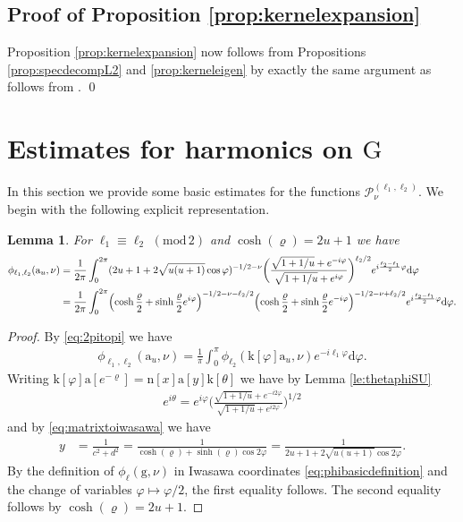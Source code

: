 \documentclass[12pt]{amsart}
\newtheorem{lemma}[theorem]{Lemma}
\theoremstyle{definition}
\theoremstyle{remark}
\numberwithin{equation}{section}
\newcommand{\G}{\mathrm{G}}
\newcommand{\PP}{\mathcal{P}}
\newcommand{\1}{{\mathbf 1}}
\renewcommand{\a}{\mathrm{a}}
\newcommand{\n}{\mathrm{n}}
\renewcommand{\k}{\mathrm{k}}
\newcommand{\g}{\mathrm{g}}
\renewcommand{\d}{\mathrm d}
\renewcommand{\n}{\mathrm{n}}
\renewcommand{\pmod}[1]{\,\,(\mathrm{mod}\,{#1})}
\begin{document}
\subsection{Proof of Proposition \ref{prop:kernelexpansion}}
Proposition \ref{prop:kernelexpansion} now follows from Propositions \ref{prop:specdecompL2}  and \ref{prop:kerneleigen}  by exactly the same argument as \cite[Proposition 5.1]{GM} follows from \cite[Proposition 5.2]{GM}.
\qed

\section{Estimates for harmonics on $\G$}
In this section we provide some basic estimates for the functions $\PP_\nu^{(\ell_1,\ell_2)}$. We begin with the following explicit representation.
\begin{lemma}\label{lem:phirewritten}
For $\ell_1 \equiv \ell_2 \pmod{2}$ and $ \cosh(\varrho) = 2u+1$  we have
    \begin{align*}
       \phi_{\ell_1,\ell_2}(\a_u,\nu) &= \frac{1}{ 2\pi } \int_0^{2\pi } (2u+1 + 2\sqrt{u(u+1)} \cos \varphi)^{-1/2-\nu}  
 \bigg(\frac{\sqrt{1+1/u} + e^{-i\varphi}}{\sqrt{1+1/u} + e^{i\varphi}}\bigg)^{\ell_2/2} e^{i\frac{\ell_2-\ell_1}{2} \varphi } \d \varphi\\
 &= \frac{1}{2 \pi } \int_0^{2\pi} \Bigl(\cosh \frac{\varrho}{2}+\sinh \frac{\varrho}{2} e^{i \varphi}\Bigr)^{-1/2-\nu-\ell_2/2}\Bigl(\cosh \frac{\varrho}{2}+\sinh \frac{\varrho}{2} e^{-i\varphi}\Bigr)^{-1/2-\nu+\ell_2/2} e^{i\frac{\ell_2-\ell_1}{2} \varphi } \d \varphi.
    \end{align*}
    \end{lemma}
\begin{proof}




By \eqref{eq:2pitopi} we have
\begin{align*}
    \phi_{\ell_1,\ell_2}(\a_u,\nu) =  \frac{1}{ \pi} \int_0^{\pi}   \phi_{\ell_2}(\k[\varphi]\a_u,\nu) e^{-i\ell_1 \varphi} \d \varphi. 
\end{align*}
Writing $\k[\varphi]\a[e^{-\varrho}]=\n[x]\a[y]\k[\theta]$ we have by Lemma \ref{le:thetaphiSU}
\begin{align*}
    e^{i\theta}=e^{ i\varphi}\bigg(\frac{\sqrt{1+1/u} + e^{-i2\varphi}}{\sqrt{1+1/u} + e^{i2\varphi}}\bigg)^{1/2}
\end{align*}
and by \eqref{eq:matrixtoiwasawa} we have
\begin{align*}
     y&= \frac{1}{c^2+d^2}= \frac{1}{\cosh(\varrho) + \sinh (\varrho) \cos 2 \varphi}=\frac{1}{2u+1 + 2\sqrt{u(u+1)} \cos 2 \varphi}.
\end{align*}
By the definition of $\phi_\ell(\g,\nu)$ in Iwasawa coordinates \eqref{eq:phibasicdefinition} and the change of variables $\varphi \mapsto \varphi/2$, the first equality follows. The second equality follows by $\cosh(\varrho) = 2u+1$. 
\end{proof}
\end{document}

